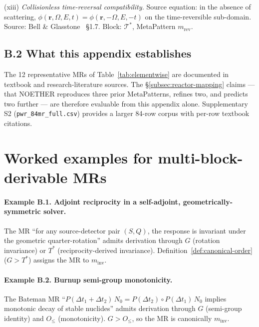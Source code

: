 \noindent (xiii) \emph{Collisionless time-reversal compatibility.} Source equation: in the absence of scattering, $\phi(\mathbf{r}, \Omega, E, t) = \phi(\mathbf{r}, -\Omega, E, -t)$ on the time-reversible sub-domain. Source: Bell \& Glasstone~\cite{BellGlasstone1970} §1.7. Block: $\mathcal{T}^*$, MetaPattern $m_{\mathrm{rev}}$.

\subsection*{B.2 What this appendix establishes}
The 12 representative MRs of Table~\ref{tab:elementwise} are documented in textbook and research-literature sources. The §\ref{subsec:reactor-mapping} claims --- that NOETHER reproduces three prior MetaPatterns, refines two, and predicts two further --- are therefore evaluable from this appendix alone. Supplementary S2 (\texttt{pwr\_84mr\_full.csv}) provides a larger 84-row corpus with per-row textbook citations.

\section{Worked examples for multi-block-derivable MRs}
\label{app:multi-block}

\paragraph{Example B.1. Adjoint reciprocity in a self-adjoint, geometrically-symmetric solver.} The MR ``for any source-detector pair $(S, Q)$, the response is invariant under the geometric quarter-rotation'' admits derivation through $G$ (rotation invariance) or $T^{*}$ (reciprocity-derived invariance). Definition~\ref{def:canonical-order} ($G > T^{*}$) assigns the MR to $m_{\mathrm{inv}}$.

\paragraph{Example B.2. Burnup semi-group monotonicity.} The Bateman MR ``$P(\Delta t_1 + \Delta t_2)\,N_0 = P(\Delta t_2)\circ P(\Delta t_1)\,N_0$ implies monotonic decay of stable nuclides'' admits derivation through $G$ (semi-group identity) and $O_{\le}$ (monotonicity). $G > O_{\le}$, so the MR is canonically $m_{\mathrm{inv}}$.

